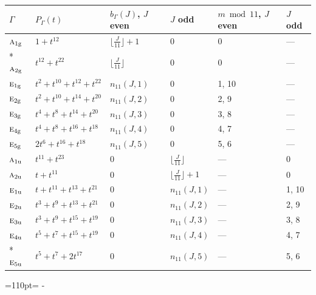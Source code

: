 \documentclass[10pt,a4paper]{article}
\newcommand{\needspace}[1]{\par\penalty-100\begingroup\dimen0=#1\relax\dimen2=\pagegoal
  \advance\dimen2-\pagetotal\ifdim\dimen0>\dimen2\relax\ifdim\dimen2>0pt\vfil\break\fi\fi
  \endgroup}
\numberwithin{equation}{section}
\newcommand{\irr}[1]{\text{\normalfont\scshape #1}}
\newcommand{\ptag}[1]{\mathrm{#1}}
\begin{document}
{\small{\renewcommand{\arraystretch}{1.3}\begin{longtable}{@{}llllll@{}}\toprule
$\Gamma$ & $P_\Gamma(t)$ & $b_\Gamma(J)$, $J$ even & $J$ odd & $m \bmod 11$, $J$ even & $J$ odd\\\midrule\endhead
\bottomrule\endfoot\endlastfoot
$\irr{a}_{1\ptag{g}}$ & $1 + t^{12}$ & $\bigl\lfloor\tfrac{J}{11}\bigr\rfloor + 1$ & $0$ & 0 & ---\\*
$\irr{a}_{2\ptag{g}}$ & $t^{12} + t^{22}$ & $\bigl\lfloor\tfrac{J}{11}\bigr\rfloor$ & $0$ & 0 & ---\\
$\irr{e}_{1\ptag{g}}$ & $t^{2} + t^{10} + t^{12} + t^{22}$ & $n_{11}(J,1)$ & $0$ & 1, 10 & ---\\
$\irr{e}_{2\ptag{g}}$ & $t^{2} + t^{10} + t^{14} + t^{20}$ & $n_{11}(J,2)$ & $0$ & 2, 9 & ---\\
$\irr{e}_{3\ptag{g}}$ & $t^{4} + t^{8} + t^{14} + t^{20}$ & $n_{11}(J,3)$ & $0$ & 3, 8 & ---\\
$\irr{e}_{4\ptag{g}}$ & $t^{4} + t^{8} + t^{16} + t^{18}$ & $n_{11}(J,4)$ & $0$ & 4, 7 & ---\\
$\irr{e}_{5\ptag{g}}$ & $2t^{6} + t^{16} + t^{18}$ & $n_{11}(J,5)$ & $0$ & 5, 6 & ---\\
$\irr{a}_{1\ptag{u}}$ & $t^{11} + t^{23}$ & $0$ & $\bigl\lfloor\tfrac{J}{11}\bigr\rfloor$ & --- & 0\\
$\irr{a}_{2\ptag{u}}$ & $t + t^{11}$ & $0$ & $\bigl\lfloor\tfrac{J}{11}\bigr\rfloor + 1$ & --- & 0\\
$\irr{e}_{1\ptag{u}}$ & $t + t^{11} + t^{13} + t^{21}$ & $0$ & $n_{11}(J,1)$ & --- & 1, 10\\
$\irr{e}_{2\ptag{u}}$ & $t^{3} + t^{9} + t^{13} + t^{21}$ & $0$ & $n_{11}(J,2)$ & --- & 2, 9\\
$\irr{e}_{3\ptag{u}}$ & $t^{3} + t^{9} + t^{15} + t^{19}$ & $0$ & $n_{11}(J,3)$ & --- & 3, 8\\
$\irr{e}_{4\ptag{u}}$ & $t^{5} + t^{7} + t^{15} + t^{19}$ & $0$ & $n_{11}(J,4)$ & --- & 4, 7\\*
$\irr{e}_{5\ptag{u}}$ & $t^{5} + t^{7} + 2t^{17}$ & $0$ & $n_{11}(J,5)$ & --- & 5, 6\\
\bottomrule\end{longtable}}}
\needspace{110pt}
\end{document}
